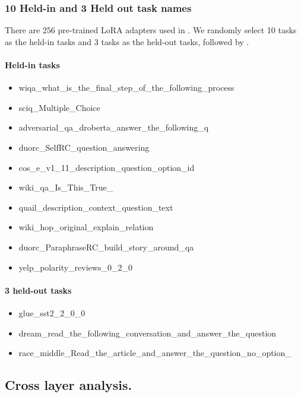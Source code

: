 \documentclass[10pt]{article} %
\begin{document}
\subsubsection{10 Held-in and 3 Held out task names}
\label{sec:10_held_in}

There are 256 pre-trained LoRA adapters used in \cite{ostapenko2024towards}. We randomly select 10 tasks as the held-in tasks and 3 tasks as the held-out tasks, followed by \cite{arnob2025exploring}. 

\paragraph{Held-in tasks}

\begin{itemize}
    \item wiqa\_what\_is\_the\_final\_step\_of\_the\_following\_process
    \item sciq\_Multiple\_Choice
    \item adversarial\_qa\_droberta\_answer\_the\_following\_q
    \item duorc\_SelfRC\_question\_answering
    \item cos\_e\_v1\_11\_description\_question\_option\_id
    \item wiki\_qa\_Is\_This\_True\_
    \item quail\_description\_context\_question\_text
    \item wiki\_hop\_original\_explain\_relation
    \item duorc\_ParaphraseRC\_build\_story\_around\_qa
    \item yelp\_polarity\_reviews\_0\_2\_0
\end{itemize}

\paragraph{3 held-out tasks}
\begin{itemize}
    \item glue\_sst2\_2\_0\_0
    \item dream\_read\_the\_following\_conversation\_and\_answer\_the\_question
    \item race\_middle\_Read\_the\_article\_and\_answer\_the\_question\_no\_option\_
\end{itemize}

\subsection{Cross layer analysis.}
\end{document}
